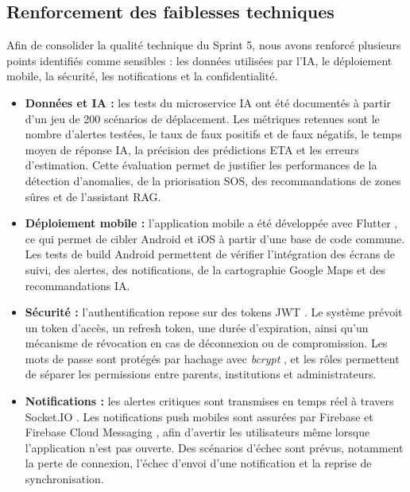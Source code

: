 \subsection{Renforcement des faiblesses techniques}

Afin de consolider la qualité technique du Sprint 5, nous avons renforcé plusieurs points identifiés comme sensibles : les données utilisées par l’IA, le déploiement mobile, la sécurité, les notifications et la confidentialité.

\begin{itemize}
    \item \textbf{Données et IA :} les tests du microservice IA ont été documentés à partir d’un jeu de 200 scénarios de déplacement. Les métriques retenues sont le nombre d’alertes testées, le taux de faux positifs et de faux négatifs, le temps moyen de réponse IA, la précision des prédictions ETA et les erreurs d’estimation. Cette évaluation permet de justifier les performances de la détection d’anomalies, de la priorisation SOS, des recommandations de zones sûres et de l’assistant RAG.
    
    \item \textbf{Déploiement mobile :} l’application mobile a été développée avec Flutter \cite{flutter}, ce qui permet de cibler Android et iOS à partir d’une base de code commune. Les tests de build Android permettent de vérifier l’intégration des écrans de suivi, des alertes, des notifications, de la cartographie Google Maps \cite{googlemaps} et des recommandations IA.
    
    \item \textbf{Sécurité :} l’authentification repose sur des tokens JWT \cite{jwt}. Le système prévoit un token d’accès, un refresh token, une durée d’expiration, ainsi qu’un mécanisme de révocation en cas de déconnexion ou de compromission. Les mots de passe sont protégés par hachage avec \textit{bcrypt} \cite{bcrypt}, et les rôles permettent de séparer les permissions entre parents, institutions et administrateurs.
    
    \item \textbf{Notifications :} les alertes critiques sont transmises en temps réel à travers Socket.IO \cite{socketio}. Les notifications push mobiles sont assurées par Firebase \cite{firebase} et Firebase Cloud Messaging \cite{fcm}, afin d’avertir les utilisateurs même lorsque l’application n’est pas ouverte. Des scénarios d’échec sont prévus, notamment la perte de connexion, l’échec d’envoi d’une notification et la reprise de synchronisation.
    

\end{itemize}

